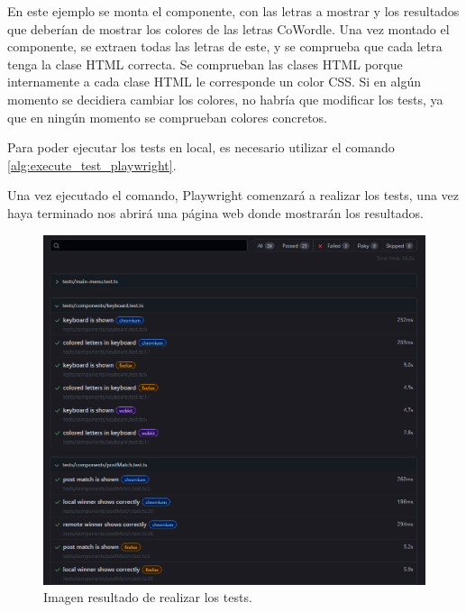 En este ejemplo se monta el componente, con las letras a mostrar y los resultados que deberían de mostrar los colores de las letras CoWordle. Una vez montado el componente, se extraen todas las letras de este, y se comprueba que cada letra tenga la clase HTML correcta. Se comprueban las clases HTML porque internamente a cada clase HTML le corresponde un color CSS. Si en algún momento se decidiera cambiar los colores, no habría que modificar los tests, ya que en ningún momento se comprueban colores concretos.

Para poder ejecutar los tests en local, es necesario utilizar el comando \ref{alg:execute_test_playwright}.


Una vez ejecutado el comando, Playwright comenzará a realizar los tests, una vez haya terminado nos abrirá una página web donde mostrarán los resultados.

\begin{figure}[H]
	\centering
	\includegraphics[clip=true, width=\textwidth]{images/tests/playwright_web.png}
	\caption{Imagen resultado de realizar los tests.}
	\label{fig:playwright_tests_result}
\end{figure}

